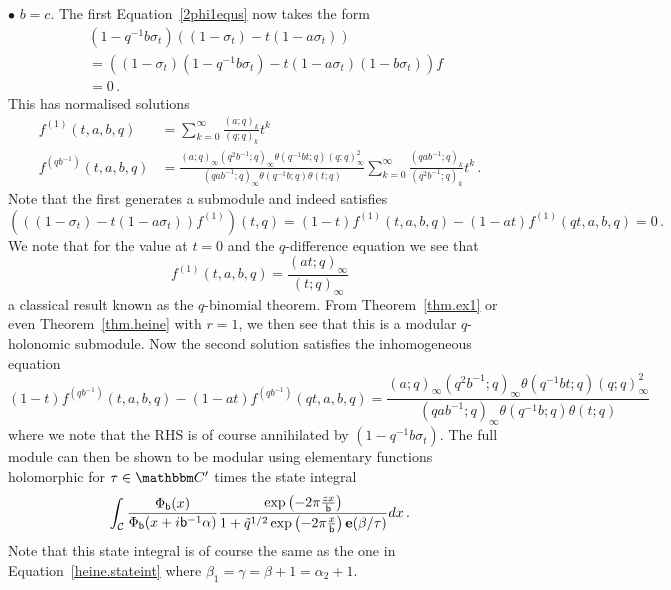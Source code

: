 \documentclass[12pt,reqno]{amsart}
\theoremstyle{definition}
\def\BR{\mathbbm R}
\def\BC{\mathbbm C}
\def\calC{\mathcal C}
\def\s{\sigma}
\def\tq{\tilde{q}}
\def\ve{\varepsilon}
\def\be{\begin{equation}}
\def\ee{\end{equation}}
\def\sfb{\mathsf{b}}
\def\e{\bold e}
\def\sfb{\mathsf{b}}
\begin{document}
\noindent
$\bullet \,\, b=c$. 
The first Equation~\eqref{2phi1equs} now takes the form
\be
\begin{aligned}
  &(1-q^{-1}b\s_{t})\left((1-\s_{t})-t(1-a\s_{t})\right)\\
  &=\left((1-\s_{t})(1-q^{-1}b\s_{t})-t(1-a\s_{t})(1-b\s_{t})\right)f\\
  &=0\,.
\end{aligned}
\ee
This has normalised solutions
\be
\begin{aligned}
  f^{(1)}(t,a,b,q)
  &=
  \sum_{k=0}^{\infty}\frac{(a;q)_{k}}{(q;q)_{k}}t^{k}\\
  f^{(qb^{-1})}(t,a,b,q)
  &=
  \frac{(a;q)_{\infty}(q^{2}b^{-1};q)_{\infty}
  \theta(q^{-1}bt;q)(q;q)_{\infty}^{2}}{(qab^{-1};q)_{\infty}\theta(q^{-1}b;q)
  \theta(t;q)}\sum_{k=0}^{\infty}\frac{(qab^{-1};q)_{k}}{(q^{2}b^{-1};q)_{k}}t^{k}\,.
\end{aligned}
\ee
Note that the first generates a submodule and indeed satisfies
\be
\left(\left((1-\s_{t})-t(1-a\s_{t})\right)f^{(1)}\right)(t,q)
=(1-t)f^{(1)}(t,a,b,q)-(1-at)f^{(1)}(qt,a,b,q)=0\,.
\ee
We note that for the value at $t=0$ and the $q$-difference equation we see that
\be
  f^{(1)}(t,a,b,q)
  =
  \frac{(at;q)_{\infty}}{(t;q)_{\infty}}
\ee
a classical result known as the $q$-binomial theorem. From Theorem~\ref{thm.ex1} or
even Theorem~\ref{thm.heine} with $r=1$, we then see that this is a modular
$q$-holonomic submodule. Now the second solution satisfies the inhomogeneous equation
\be
(1-t)f^{(qb^{-1})}(t,a,b,q)-(1-at)f^{(qb^{-1})}(qt,a,b,q)
=\frac{(a;q)_{\infty}(q^{2}b^{-1};q)_{\infty}
  \theta(q^{-1}bt;q)(q;q)_{\infty}^{2}}{(qab^{-1};q)_{\infty}
  \theta(q^{-1}b;q)\theta(t;q)}
\ee
where we note that the RHS is of course annihilated by $(1-q^{-1}b\s_{t})$. The full
module can then be shown to be modular using elementary functions holomorphic for
$\tau\in\BC'$ times the state integral
\be
\begin{aligned}
\int_{\calC}
\frac{\Phi_{\sfb}(x)}
{\Phi_{\sfb}(x+i\sfb^{-1}\alpha)}
\frac{\exp\left(-2\pi\frac{zx}{\sfb}\right)}{1+\tq^{1/2}
  \exp\left(-2\pi\frac{x}{\sfb}\right)\e(\beta/\tau)}
dx \,.
\end{aligned}
\ee
Note that this state integral is of course the same as the one in
Equation~\eqref{heine.stateint} where $\beta_{1}=\gamma=\beta+1=\alpha_{2}+1$.
\end{document}
